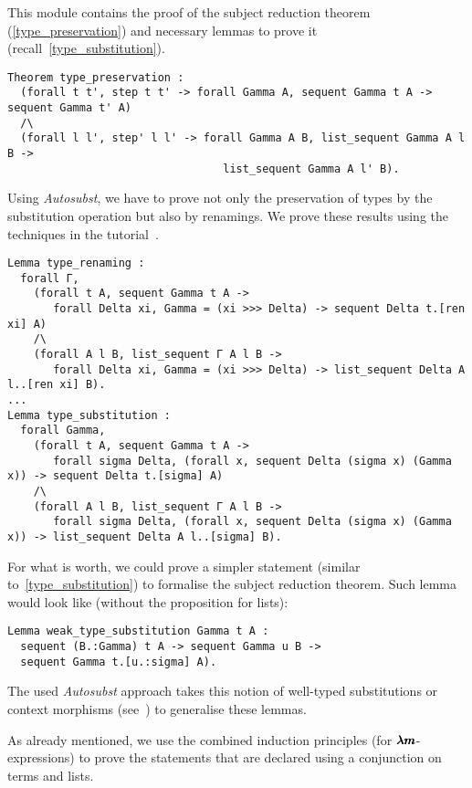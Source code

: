 This module contains the proof of the subject reduction theorem (\cref{type_preservation}) and necessary lemmas to prove it (recall~\cref{type_substitution}).

\begin{lstlisting}[language=Coq]
Theorem type_preservation :
  (forall t t', step t t' -> forall Gamma A, sequent Gamma t A -> sequent Gamma t' A)
  /\
  (forall l l', step' l l' -> forall Gamma A B, list_sequent Gamma A l B ->
                                 list_sequent Gamma A l' B).
\end{lstlisting}

Using \textit{Autosubst}, we have to prove not only the preservation of types by the substitution operation but also by renamings.
We prove these results using the techniques in the tutorial~\cite{AutosubstManual}.

\begin{lstlisting}[language=Coq]
Lemma type_renaming :
  forall Γ,
    (forall t A, sequent Gamma t A ->
       forall Delta xi, Gamma = (xi >>> Delta) -> sequent Delta t.[ren xi] A)
    /\
    (forall A l B, list_sequent Γ A l B ->
       forall Delta xi, Gamma = (xi >>> Delta) -> list_sequent Delta A l..[ren xi] B).
...
Lemma type_substitution :
  forall Gamma, 
    (forall t A, sequent Gamma t A ->
       forall sigma Delta, (forall x, sequent Delta (sigma x) (Gamma x)) -> sequent Delta t.[sigma] A)
    /\
    (forall A l B, list_sequent Γ A l B ->
       forall sigma Delta, (forall x, sequent Delta (sigma x) (Gamma x)) -> list_sequent Delta A l..[sigma] B).
\end{lstlisting}

For what is worth, we could prove a simpler statement (similar to~\cref{type_substitution}) to formalise the subject reduction theorem.
Such lemma would look like (without the proposition for lists):
\begin{lstlisting}[language=Coq]
Lemma weak_type_substitution Gamma t A :
  sequent (B.:Gamma) t A -> sequent Gamma u B ->
  sequent Gamma t.[u.:sigma] A).
\end{lstlisting}

The used \textit{Autosubst} approach takes this notion of well-typed substitutions or context morphisms (see~\cite[Chapter~4]{AutosubstSchafer}) to generalise these lemmas.

As already mentioned, we use the combined induction principles (for $\pmb{\lambda m}$-expressions) to prove the statements that are declared using a conjunction on terms and lists.


